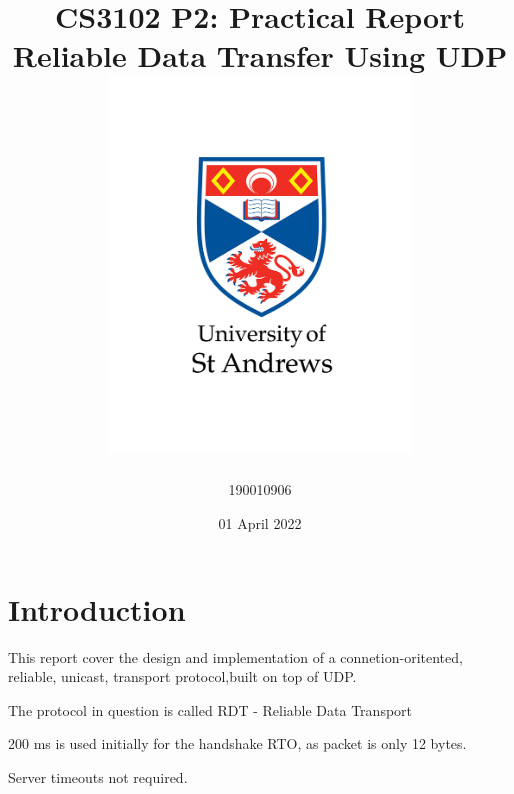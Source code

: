 \documentclass[12pt]{article}
\title{
{CS3102 P2: Practical Report}\\
{\large Reliable Data Transfer Using UDP}\\
{\includegraphics[width=80mm]{images/university-logo.png}}
}
\author{190010906}
\date{01 April 2022}
\begin{document}
\maketitle

\newpage

\section{Introduction}

This report cover the design and implementation of a connetion-oritented, reliable, unicast, transport protocol,built on top of UDP.

The protocol in question is called RDT - Reliable Data Transport



200 ms is used initially for the handshake RTO, as packet is only 12 bytes.

Server timeouts not required.




\end{document}
